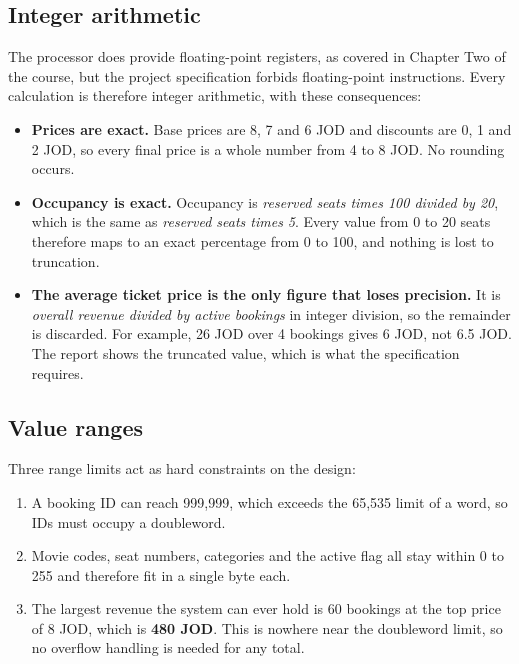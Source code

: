 \documentclass{thesis-library}
\begin{document}
\subsection{Integer arithmetic}

The processor does provide floating-point registers, as covered in Chapter Two of the course, but the project specification forbids floating-point instructions. Every calculation is therefore integer arithmetic, with these consequences:

\begin{itemize}
\item \textbf{Prices are exact.} Base prices are 8, 7 and 6 JOD and discounts are 0, 1 and 2 JOD, so every final price is a whole number from 4 to 8 JOD. No rounding occurs.
\item \textbf{Occupancy is exact.} Occupancy is \textit{reserved seats times 100 divided by 20}, which is the same as \textit{reserved seats times 5}. Every value from 0 to 20 seats therefore maps to an exact percentage from 0 to 100, and nothing is lost to truncation.
\item \textbf{The average ticket price is the only figure that loses precision.} It is \textit{overall revenue divided by active bookings} in integer division, so the remainder is discarded. For example, 26 JOD over 4 bookings gives 6 JOD, not 6.5 JOD. The report shows the truncated value, which is what the specification requires.
\end{itemize}

\subsection{Value ranges}

Three range limits act as hard constraints on the design:

\begin{enumerate}
\item A booking ID can reach 999,999, which exceeds the 65,535 limit of a word, so IDs must occupy a doubleword.
\item Movie codes, seat numbers, categories and the active flag all stay within 0 to 255 and therefore fit in a single byte each.
\item The largest revenue the system can ever hold is 60 bookings at the top price of 8 JOD, which is \textbf{480 JOD}. This is nowhere near the doubleword limit, so no overflow handling is needed for any total.
\end{enumerate}
\end{document}
